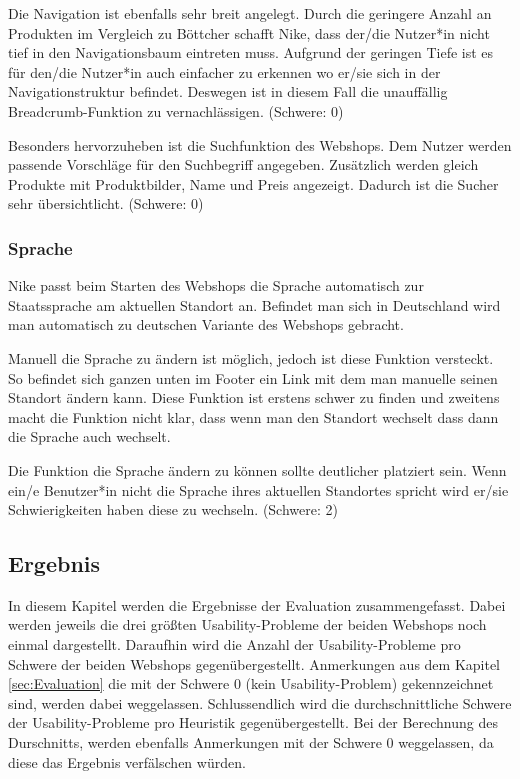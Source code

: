 \documentclass[utf8,biblatex]{lni}
\begin{document}
Die Navigation ist ebenfalls sehr breit angelegt. Durch die geringere Anzahl an Produkten im Vergleich zu Böttcher schafft Nike, dass der/die Nutzer*in nicht tief in den Navigationsbaum eintreten muss. Aufgrund der geringen Tiefe ist es für den/die Nutzer*in auch einfacher zu erkennen wo er/sie sich in der Navigationstruktur befindet. Deswegen ist in diesem Fall die unauffällig Breadcrumb-Funktion zu vernachlässigen. (Schwere: 0)

Besonders hervorzuheben ist die Suchfunktion des Webshops. Dem Nutzer werden passende Vorschläge für den Suchbegriff angegeben. Zusätzlich werden gleich Produkte mit Produktbilder, Name und Preis angezeigt. Dadurch ist die Sucher sehr übersichtlicht. (Schwere: 0)


\subsubsection*{Sprache}
Nike passt beim Starten des Webshops die Sprache automatisch zur Staatssprache am aktuellen Standort an. Befindet man sich in Deutschland wird man automatisch zu deutschen Variante des Webshops gebracht. 

Manuell die Sprache zu ändern ist möglich, jedoch ist diese Funktion versteckt. So befindet sich ganzen unten im Footer ein Link mit dem man manuelle seinen Standort ändern kann. Diese Funktion ist erstens schwer zu finden und zweitens macht die Funktion nicht klar, dass wenn man den Standort wechselt dass dann die Sprache auch wechselt. 

Die Funktion die Sprache ändern zu können sollte deutlicher platziert sein. Wenn ein/e Benutzer*in nicht die Sprache ihres aktuellen Standortes spricht wird er/sie Schwierigkeiten haben diese zu wechseln. (Schwere: 2)


\subsection*{Ergebnis}
In diesem Kapitel werden die Ergebnisse der Evaluation zusammengefasst. Dabei werden jeweils die drei größten Usability-Probleme der beiden Webshops noch einmal dargestellt. Daraufhin wird die Anzahl der Usability-Probleme pro Schwere der beiden Webshops gegenübergestellt. Anmerkungen aus dem Kapitel \ref{sec:Evaluation} die mit der Schwere 0 (kein Usability-Problem) gekennzeichnet sind, werden dabei weggelassen. Schlussendlich wird die durchschnittliche Schwere der Usability-Probleme pro Heuristik gegenübergestellt. Bei der Berechnung des Durschnitts, werden ebenfalls Anmerkungen mit der Schwere 0 weggelassen, da diese das Ergebnis verfälschen würden. 
\end{document}
